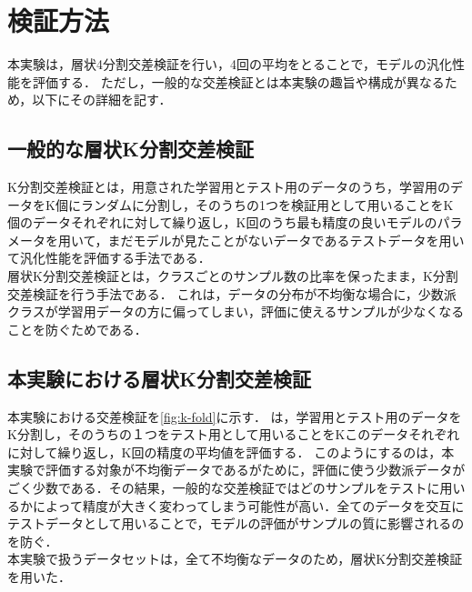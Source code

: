 \section{検証方法}
本実験は，層状4分割交差検証を行い，4回の平均をとることで，モデルの汎化性能を評価する．
ただし，一般的な交差検証とは本実験の趣旨や構成が異なるため，以下にその詳細を記す．

\subsection{一般的な層状K分割交差検証}
K分割交差検証とは，用意された学習用とテスト用のデータのうち，学習用のデータをK個にランダムに分割し，そのうちの1つを検証用として用いることをK個のデータそれぞれに対して繰り返し，K回のうち最も精度の良いモデルのパラメータを用いて，まだモデルが見たことがないデータであるテストデータを用いて汎化性能を評価する手法である．\\

層状K分割交差検証とは，クラスごとのサンプル数の比率を保ったまま，K分割交差検証を行う手法である．
これは，データの分布が不均衡な場合に，少数派クラスが学習用データの方に偏ってしまい，評価に使えるサンプルが少なくなることを防ぐためである．


\subsection{本実験における層状K分割交差検証}\label{sec:verification-method}
本実験における交差検証を\ref{fig:k-fold}に示す． は，学習用とテスト用のデータをK分割し，そのうちの１つをテスト用として用いることをKこのデータそれぞれに対して繰り返し，K回の精度の平均値を評価する．
このようにするのは，本実験で評価する対象が不均衡データであるがために，評価に使う少数派データがごく少数である．その結果，一般的な交差検証ではどのサンプルをテストに用いるかによって精度が大きく変わってしまう可能性が高い．全てのデータを交互にテストデータとして用いることで，モデルの評価がサンプルの質に影響されるのを防ぐ．\\
本実験で扱うデータセットは，全て不均衡なデータのため，層状K分割交差検証を用いた．

